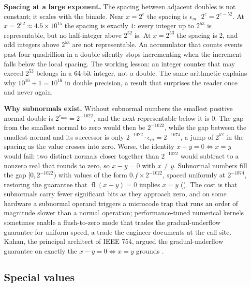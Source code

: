 \begin{example}
\textbf{Spacing at a large exponent.} The spacing between adjacent
doubles is not constant; it scales with the binade. Near $x = 2^{e}$
the spacing is $\epsilon_{m} \cdot 2^{e} = 2^{e - 52}$. At
$x = 2^{52} \approx 4.5 \times 10^{15}$ the spacing is exactly $1$:
every integer up to $2^{53}$ is representable, but no half-integer
above $2^{52}$ is. At $x = 2^{53}$ the spacing is $2$, and odd
integers above $2^{53}$ are not representable. An accumulator that
counts events past four quadrillion in a double silently stops
incrementing when the increment falls below the local spacing. The
working lesson: an integer counter that may exceed $2^{53}$ belongs
in a 64-bit integer, not a double. The same arithmetic explains why
$10^{16} + 1 = 10^{16}$ in double precision, a result that surprises
the reader once and never again.
\end{example}

\begin{mastery}
\textbf{Why subnormals exist.} Without subnormal numbers the smallest
positive normal double is $2^{e_{\min}} = 2^{-1022}$, and the next
representable below it is $0$. The gap from the smallest normal to
zero would then be $2^{-1022}$, while the gap between the smallest
normal and its successor is only $2^{-1022} \cdot \epsilon_{m} =
2^{-1074}$, a jump of $2^{52}$ in the spacing as the value crosses
into zero. Worse, the identity $x - y = 0 \iff x = y$ would fail:
two distinct normals closer together than $2^{-1022}$ would subtract
to a nonzero real that rounds to zero, so $x - y = 0$ with $x \neq
y$. Subnormal numbers fill the gap $[0, 2^{-1022})$ with values of
the form $0.f \times 2^{-1022}$, spaced uniformly at $2^{-1074}$,
restoring the guarantee that $\operatorname{fl}(x - y) = 0$ implies
$x = y$ (). The cost is that subnormals
carry fewer significant bits as they approach zero, and on some
hardware a subnormal operand triggers a microcode trap that runs an
order of magnitude slower than a normal operation; performance-tuned
numerical kernels sometimes enable a flush-to-zero mode that trades
the gradual-underflow guarantee for uniform speed, a trade the
engineer documents at the call site. Kahan, the principal architect
of IEEE 754, argued the gradual-underflow guarantee on exactly the
$x - y = 0 \iff x = y$ grounds \cite[ch.~2]{text:overton-ieee754}.
\end{mastery}

\subsection{Special values}

